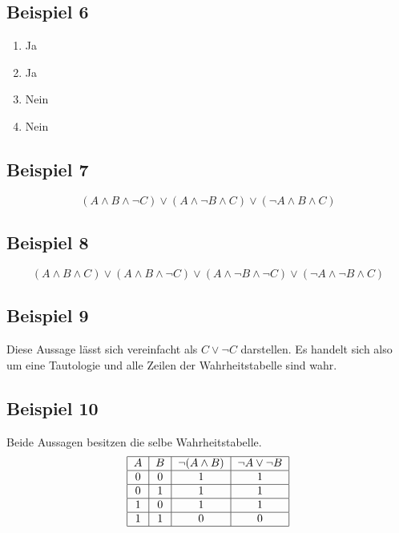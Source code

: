 \documentclass[12pt, a4paper, oneside]{article}
\begin{document}
\subsection{Beispiel 6}
\begin{enumerate}
  \item Ja
  \item Ja
  \item Nein
  \item Nein
\end{enumerate}

\subsection{Beispiel 7}
\begin{equation*}
  (A \land B \land \lnot C) \lor (A \land \lnot B \land C) \lor (\lnot A \land B \land C)
\end{equation*}

\subsection{Beispiel 8}
\begin{equation*}
  (A \land B \land C) \lor (A \land B \land \lnot C) \lor (A \land \lnot B \land \lnot C) \lor (\lnot A \land \lnot B \land C)
\end{equation*}

\subsection{Beispiel 9}
  Diese Aussage lässt sich vereinfacht als $C \lor \lnot C$ darstellen. Es handelt sich also um eine Tautologie und alle Zeilen der Wahrheitstabelle sind wahr.

\subsection{Beispiel 10}
Beide Aussagen besitzen die selbe Wahrheitstabelle.
\begin{equation*}
  \begin{tabular}{|c|c|c|c|}
    \hline
    $A$ & $B$ & $\lnot(A \land B)$ & $\lnot A \lor \lnot B$ \\ \hline
    0 & 0 & 1 & 1 \\ \hline
    0 & 1 & 1 & 1 \\ \hline
    1 & 0 & 1 & 1 \\ \hline
    1 & 1 & 0 & 0 \\ \hline
  \end{tabular}
\end{equation*}
\end{document}
